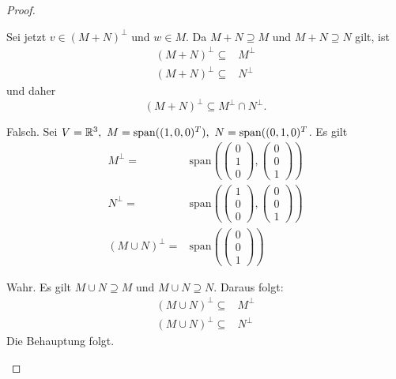 \begin{proof}
\begin{parts}
	Sei jetzt $v\in (M+ N)^\perp$ und $w\in M$. Da $M+N\supseteq M$ und $M+N\supseteq N$ gilt, ist
	\begin{align*}
		(M+N)^\perp \subseteq& M^\perp\\
		(M+N)^\perp \subseteq& N^\perp
	\end{align*}
	und daher
	\[
		(M+N)^\perp\subseteq M^\perp\cap N^\perp
	.\] 
\item Falsch. Sei $V=\mathbb{R}^3,~M=\text{span}((1,0,0)^T),~N=\text{span}((0,1,0)^T$. Es gilt
	\begin{align*}
		M^\perp=&\text{span}\left( \begin{pmatrix} 0 \\ 1 \\ 0 \end{pmatrix}, \begin{pmatrix} 0 \\ 0 \\ 1 \end{pmatrix}  \right)\\
		N^\perp=&\text{span}\left( \begin{pmatrix} 1 \\ 0 \\ 0 \end{pmatrix}, \begin{pmatrix} 0 \\ 0 \\ 1 \end{pmatrix}  \right) \\
		(M\cup N)^\perp =& \text{span}\left( \begin{pmatrix} 0 \\ 0 \\ 1 \end{pmatrix}  \right) 
	\end{align*}
\item Wahr. Es gilt $M\cup N\supseteq M$ und $M\cup N\supseteq N$. Daraus folgt:
	\begin{align*}
		(M\cup N)^\perp \subseteq& M^\perp\\
		(M\cup N)^\perp\subseteq& N^\perp
	\end{align*}
	Die Behauptung folgt.\qedhere
\end{parts}	
\end{proof}
